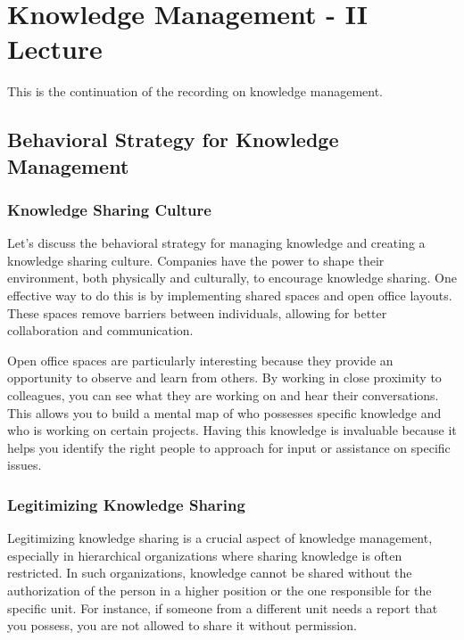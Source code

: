\section{Knowledge Management - II Lecture}

This is the continuation of the
recording on knowledge management.

\subsection{Behavioral Strategy for Knowledge
  Management}\label{behavioral-strategy-for-knowledge-management}

\subsubsection{Knowledge Sharing Culture}\label{knowledge-sharing-culture}

Let's discuss the behavioral strategy for managing knowledge and
creating a knowledge sharing culture. Companies have the power to shape
their environment, both physically and culturally, to encourage
knowledge sharing. One effective way to do this is by implementing
shared spaces and open office layouts. These spaces remove barriers
between individuals, allowing for better collaboration and
communication.

Open office spaces are particularly interesting because they provide an
opportunity to observe and learn from others. By working in close
proximity to colleagues, you can see what they are working on and hear
their conversations. This allows you to build a mental map of who
possesses specific knowledge and who is working on certain projects.
Having this knowledge is invaluable because it helps you identify the
right people to approach for input or assistance on specific issues.

\subsubsection{Legitimizing Knowledge
  Sharing}\label{legitimizing-knowledge-sharing}

Legitimizing knowledge sharing is a crucial aspect of knowledge
management, especially in hierarchical organizations where sharing
knowledge is often restricted. In such organizations, knowledge cannot
be shared without the authorization of the person in a higher position
or the one responsible for the specific unit. For instance, if someone
from a different unit needs a report that you possess, you are not
allowed to share it without permission.

